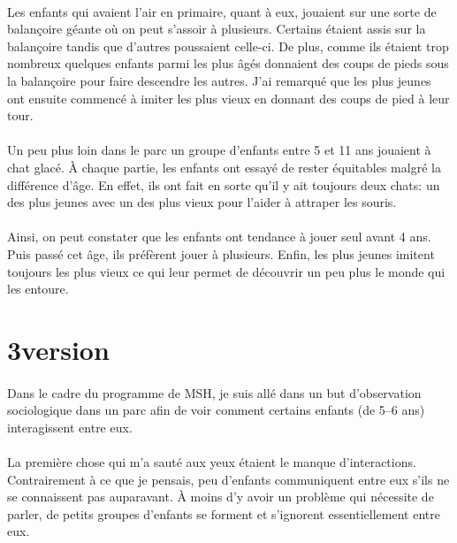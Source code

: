 \paragraph{} Les enfants qui avaient l'air en primaire, quant à eux, jouaient
sur une sorte de balançoire géante où on peut s'assoir à plusieurs. Certains
étaient assis sur la balançoire tandis que d'autres poussaient celle-ci. De
plus, comme ils étaient trop nombreux quelques enfants parmi les plus âgés
donnaient des coups de pieds sous la balançoire pour faire descendre les
autres. J'ai remarqué que les plus jeunes ont ensuite commencé à imiter les
plus vieux en donnant des coups de pied à leur tour.

\paragraph{} Un peu plus loin dans le parc un groupe d'enfants entre 5 et 11
ans jouaient à chat glacé. À chaque partie, les enfants ont essayé de rester
équitables malgré la différence d'âge. En effet, ils ont fait en sorte qu'il y
ait toujours deux chats: un des plus jeunes avec un des plus vieux pour l'aider
à attraper les souris.

\paragraph{} Ainsi, on peut constater que les enfants ont tendance à jouer seul
avant 4 ans. Puis passé cet âge, ils préfèrent jouer à plusieurs. Enfin, les
plus jeunes imitent toujours les plus vieux ce qui leur permet de découvrir un
peu plus le monde qui les entoure.

\section{3\ieme version}

\paragraph{} Dans le cadre du programme de MSH, je suis allé dans un but
d'observation sociologique dans un parc afin de voir comment certains enfants
(de 5--6 ans) interagissent entre eux.

\paragraph{} La première chose qui m'a sauté aux yeux étaient le manque
d'interactions. Contrairement à ce que je pensais, peu d'enfants communiquent
entre eux s'ils ne se connaissent pas auparavant. À moins d'y avoir un problème
qui nécessite de parler, de petits groupes d'enfants se forment et s'ignorent
essentiellement entre eux.

